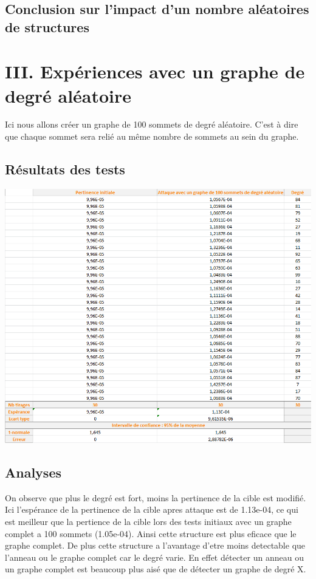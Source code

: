 \documentclass[a4paper,11pt]{article}
\begin{document}
	\subsection{Conclusion sur l'impact d'un nombre aléatoires de structures}


\section{III.	Expériences avec un graphe de degré aléatoire}
	Ici nous allons créer un graphe de 100 sommets de degré aléatoire. C'est à dire que chaque sommet sera relié au même nombre de sommets au sein du graphe.

	\subsection{Résultats des tests}
		\includegraphics[scale = 0.5]{Captures/ranking4.PNG}\\
		
	
	\subsection{Analyses}
		On observe que plus le degré est fort, moins la pertinence de la cible est modifié. Ici l'espérance de la pertinence de la cible apres attaque est de 1.13e-04, ce qui est 
		meilleur que la pertience de la cible lors des tests initiaux avec un graphe complet a 100 sommets (1.05e-04). Ainsi cette structure est plus eficace que le graphe complet.
		De plus cette structure a l'avantage d'etre moins detectable que l'anneau ou le graphe complet car le degré varie. En effet détecter un anneau ou un graphe complet est beaucoup plus aisé 
		que de détecter un graphe de degré X.
	
\end{document}
